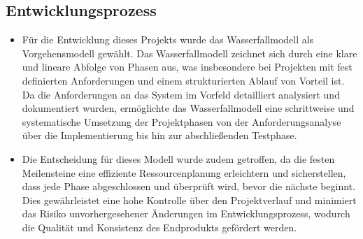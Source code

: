 \subsection{Entwicklungsprozess}
\label{sec:Entwicklungsprozess}
\begin{itemize}
	\item Für die Entwicklung dieses Projekts wurde das Wasserfallmodell als Vorgehensmodell gewählt. Das Wasserfallmodell zeichnet sich durch eine klare und lineare Abfolge von Phasen aus, was insbesondere bei Projekten mit fest definierten Anforderungen und einem strukturierten Ablauf von Vorteil ist. Da die Anforderungen an das System im Vorfeld detailliert analysiert und dokumentiert wurden, ermöglichte das Wasserfallmodell eine schrittweise und systematische Umsetzung der Projektphasen von der Anforderungsanalyse über die Implementierung bis hin zur abschließenden Testphase. 
	\item Die Entscheidung für dieses Modell wurde zudem getroffen, da die festen Meilensteine eine effiziente Ressourcenplanung erleichtern und sicherstellen, dass jede Phase abgeschlossen und überprüft wird, bevor die nächste beginnt. Dies gewährleistet eine hohe Kontrolle über den Projektverlauf und minimiert das Risiko unvorhergesehener Änderungen im Entwicklungsprozess, wodurch die Qualität und Konsistenz des Endprodukts gefördert werden.
\end{itemize}
